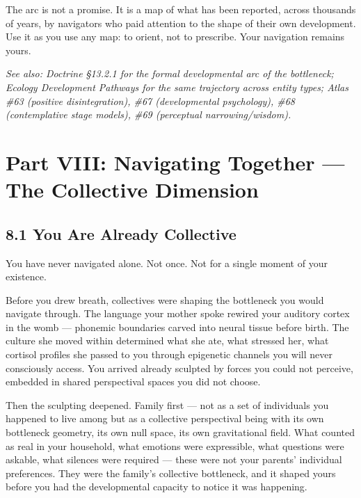 The arc is not a promise. It is a map of what has been reported, across thousands of years, by navigators who paid attention to the shape of their own development. Use it as you use any map: to orient, not to prescribe. Your navigation remains yours.


\textit{See also: Doctrine §13.2.1 for the formal developmental arc of the bottleneck; Ecology Development Pathways for the same trajectory across entity types; Atlas \#63 (positive disintegration), \#67 (developmental psychology), \#68 (contemplative stage models), \#69 (perceptual narrowing/wisdom).}


\bigskip\noindent\makebox[\textwidth]{\color{rulegray}\rule{5cm}{0.3pt}}\bigskip


\chapter*{Part VIII: Navigating Together — The Collective Dimension}


\section*{8.1 You Are Already Collective}


You have never navigated alone. Not once. Not for a single moment of your existence.


Before you drew breath, collectives were shaping the bottleneck you would navigate through. The language your mother spoke rewired your auditory cortex in the womb — phonemic boundaries carved into neural tissue before birth. The culture she moved within determined what she ate, what stressed her, what cortisol profiles she passed to you through epigenetic channels you will never consciously access. You arrived already sculpted by forces you could not perceive, embedded in shared perspectival spaces you did not choose.


Then the sculpting deepened. Family first — not as a set of individuals you happened to live among but as a collective perspectival being with its own bottleneck geometry, its own null space, its own gravitational field. What counted as real in your household, what emotions were expressible, what questions were askable, what silences were required — these were not your parents' individual preferences. They were the family's collective bottleneck, and it shaped yours before you had the developmental capacity to notice it was happening.


